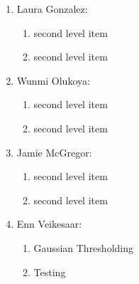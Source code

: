 \documentclass[12pt]{article}
\begin{document}
\begin{enumerate}
\item Laura Gonzalez:
    \begin{enumerate}
          \item second level item
          \item second level item
    \end{enumerate}
\item Wunmi Olukoya:
        \begin{enumerate}
          \item second level item
          \item second level item
    \end{enumerate}
\item Jamie McGregor: 
        \begin{enumerate}
          \item second level item
          \item second level item
    \end{enumerate}
\item Enn Veikesaar:
        \begin{enumerate}
          \item Gaussian Thresholding  
          \item Testing
    \end{enumerate}
\end{enumerate}

\clearpage


\vspace{0.1 in}

\vspace{0.1 in}

\vspace{0.1 in}

\vspace{0.1 in}

\vspace{0.1 in}

\vspace{0.1 in}

\vspace{0.1 in}


\newpage
\singlespacing


\end{document}
